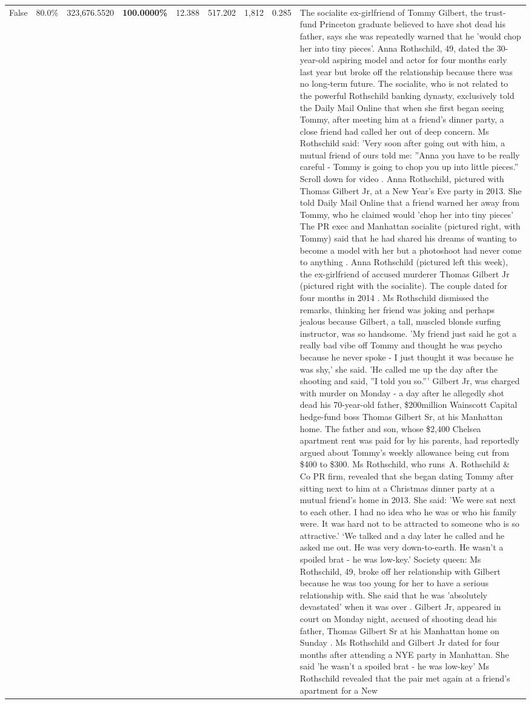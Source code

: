 \begin{table}[H]
\begin{tabular}{lllrlllll}
False & 80.0\% & 323,676.5520 & \bfseries \color{red} 100.0000\% & 12.388 & 517.202 & 1,812 & 0.285 & The socialite ex-girlfriend of Tommy Gilbert, the trust-fund Princeton graduate believed to have shot dead his father, says she was repeatedly warned that he 'would chop her into tiny pieces'. Anna Rothschild, 49, dated the 30-year-old aspiring model and actor for four months early last year but broke off the relationship because there was no long-term future. The socialite, who is not related to the powerful Rothschild banking dynasty, exclusively told the Daily Mail Online that when she first began seeing Tommy, after meeting him at a friend's dinner party, a close friend had called her out of deep concern. Ms Rothschild said: 'Very soon after going out with him, a mutual friend of ours told me: ''Anna you have to be really careful - Tommy is going to chop you up into little pieces.'' Scroll down for video . Anna Rothschild, pictured with Thomas Gilbert Jr, at a New Year's Eve party in 2013. She told Daily Mail Online that a friend warned her away from Tommy, who he claimed would 'chop her into tiny pieces' The PR exec and Manhattan socialite (pictured right, with Tommy) said that he had shared his dreams of wanting to become a model with her but a photoshoot had never come to anything . Anna Rothschild (pictured left this week), the ex-girlfriend of accused murderer Thomas Gilbert Jr (pictured right with the socialite). The couple dated for four months in 2014 . Ms Rothschild dismissed the remarks, thinking her friend was joking and perhaps jealous because Gilbert, a tall, muscled blonde surfing instructor, was so handsome. 'My friend just said he got a really bad vibe off Tommy and thought he was psycho because he never spoke - I just thought it was because he was shy,' she said. 'He called me up the day after the shooting and said, ''I told you so.''' Gilbert Jr, was charged with murder on Monday - a day after he allegedly shot dead his 70-year-old father, \$200million Wainscott Capital hedge-fund boss Thomas Gilbert Sr, at his Manhattan home. The father and son, whose \$2,400 Chelsea apartment rent was paid for by his parents, had reportedly argued about Tommy's weekly allowance being cut from \$400 to \$300. Ms Rothschild, who runs A. Rothschild \& Co PR firm, revealed that she began dating Tommy after sitting next to him at a Christmas dinner party at a mutual friend's home in 2013. She said: 'We were sat next to each other. I had no idea who he was or who his family were. It was hard not to be attracted to someone who is so attractive.' ‘We talked and a day later he called and he asked me out. He was very down-to-earth. He wasn’t a spoiled brat - he was low-key.’ Society queen: Ms Rothschild, 49, broke off her relationship with Gilbert because he was too young for her to have a serious relationship with. She said that he was 'absolutely devastated' when it was over . Gilbert Jr, appeared in court on Monday night, accused of shooting dead his father, Thomas Gilbert Sr at his Manhattan home on Sunday . Ms Rothschild and Gilbert Jr dated for four months after attending a NYE party in Manhattan. She said 'he wasn't a spoiled brat - he was low-key' Ms Rothschild revealed that the pair met again at a friend’s apartment for a New 
\end{tabular}
\end{table}
